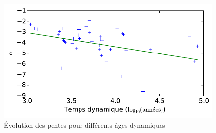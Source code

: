 				\begin{figure}[h!]
					\centering \includegraphics[scale=0.4]{graphe/pente_td.pdf}
					\caption{Évolution des pentes pour différents âges dynamiques}
					\label{Pente-Td-lin}
				\end{figure}



